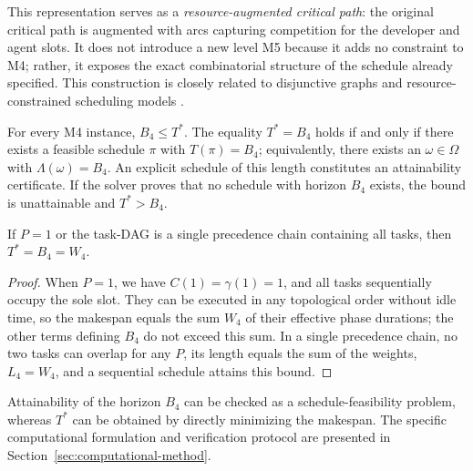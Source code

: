 This representation serves as a \emph{resource-augmented critical path}: the original critical path is augmented with arcs capturing competition for the developer and agent slots. It does not introduce a new level M5 because it adds no constraint to M4; rather, it exposes the exact combinatorial structure of the schedule already specified. This construction is closely related to disjunctive graphs and resource-constrained scheduling models \cite{brucker1999resource}.

\begin{corollary}\label{cor:attainability}
For every M4 instance, $B_4\le T^{*}$. The equality $T^{*}=B_4$ holds if and only if there exists a feasible schedule $\pi$ with $T(\pi)=B_4$; equivalently, there exists an $\omega\in\Omega$ with $\Lambda(\omega)=B_4$. An explicit schedule of this length constitutes an attainability certificate. If the solver proves that no schedule with horizon $B_4$ exists, the bound is unattainable and $T^{*}>B_4$.
\end{corollary}

\begin{corollary}\label{cor:simple-tightness}
If $P=1$ or the task-DAG is a single precedence chain containing all tasks,
then $T^*=B_4=W_4$.
\end{corollary}

\begin{proof}
When $P=1$, we have $C(1)=\gamma(1)=1$, and all tasks sequentially occupy
the sole slot. They can be executed in any topological order without idle
time, so the makespan equals the sum $W_4$ of their effective phase durations;
the other terms defining $B_4$ do not exceed this sum. In a single precedence
chain, no two tasks can overlap for any $P$, its length equals the sum of the
weights, $L_4=W_4$, and a sequential schedule attains this bound.
\end{proof}

Attainability of the horizon $B_4$ can be checked as a schedule-feasibility
problem, whereas $T^{*}$ can be obtained by directly minimizing the makespan.
The specific computational formulation and verification protocol are presented
in Section~\ref{sec:computational-method}.
